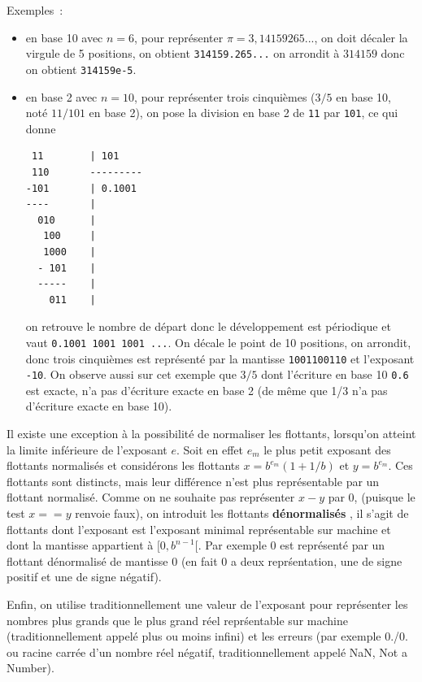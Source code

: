 \documentclass[a4paper,11pt]{article}
\begin{document}
\begin{giacjshere}
Exemples~: 
\begin{itemize}
\item en base 10 avec $n=6$, pour repr\'esenter
$\pi=3,14159265...$, on doit d\'ecaler la virgule de 5 positions,
on obtient \verb|314159.265...| on arrondit \`a $314159$ donc
on obtient \verb|314159e-5|.
\item en base 2 avec $n=10$, pour repr\'esenter trois cinqui\`emes ($3/5$
en base 10, not\'e $11/101$ en base 2), 
on pose la division en base 2 de \verb|11| par 
\verb|101|, ce qui donne
\begin{verbatim}
 11        | 101
 110       ---------
-101       | 0.1001
----       |
  010      |
   100     |
   1000    |
  - 101    |
  -----    |
    011    |
\end{verbatim}
on retrouve le nombre de d\'epart donc le d\'eveloppement est
p\'eriodique et vaut \verb|0.1001 1001 1001 ...|.
On d\'ecale le point de 10 positions, on arrondit,
donc trois cinqui\`emes est
repr\'esent\'e par la mantisse \verb|1001100110| et l'exposant
\verb|-10|. On observe aussi sur cet exemple que $3/5$ dont l'\'ecriture
en base 10 \verb|0.6| est exacte, n'a pas d'\'ecriture exacte en base
2 (de m\^eme que 1/3 n'a pas d'\'ecriture exacte en base 10).
\end{itemize}

Il existe une exception \`a la possibilit\'e de normaliser les flottants,
lorsqu'on atteint la limite inf\'erieure de l'exposant $e$. 
Soit en effet $e_m$ le plus petit exposant des flottants normalis\'es
et consid\'erons les flottants $x=b^{e_m}(1+1/b)$ et $y=b^{e_m}$. Ces
flottants sont distincts, 
mais leur diff\'erence n'est plus repr\'esentable par un flottant normalis\'e.
Comme on ne souhaite pas repr\'esenter $x-y$ par 0, 
(puisque le test $x==y$ renvoie faux), on introduit les flottants 
{\bf d\'enormalis\'es} , il s'agit de
flottants dont l'exposant est l'exposant minimal repr\'esentable sur
machine et dont la mantisse appartient \`a $[0,b^{n-1}[$. Par exemple
0 est repr\'esent\'e par un flottant d\'enormalis\'e de mantisse 0
(en fait 0 a deux repr\'sentation, une de signe positif et une de
signe n\'egatif).

Enfin, on utilise traditionnellement une valeur de l'exposant pour
repr\'esenter les nombres plus grands que le plus grand r\'eel
repr\'sentable sur machine (traditionnellement appel\'e plus ou
moins infini)
et les erreurs (par exemple 0./0. ou racine carr\'ee d'un nombre
r\'eel n\'egatif, traditionnellement appel\'e NaN, Not a Number).


\end{giacjshere}
\end{document}
